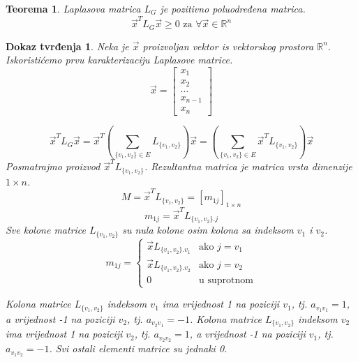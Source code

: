 \documentclass[11pt]{article}
\newtheorem{theorem}{Teorema}
\newtheorem*{custom_proof}{Dokaz tvrđenja}
\begin{document}
	\begin{theorem} Laplasova matrica $L_G$ je pozitivno poluodređena matrica. 
	\[
	  \vec{x}^TL_G\vec{x} \geq 0 \text{ za } \forall \vec{x} \in \mathbb{R}^n
	\] 
	\end{theorem}
	\begin{custom_proof}
	Neka je $\vec{x}$ proizvoljan vektor is vektorskog prostora $\mathbb{R}^n$. Iskoristićemo prvu karakterizaciju Laplasove matrice.
	\[
	\vec{x} = 
	\begin{bmatrix} 
	x_1 \\ x_2 \\ \dots \\ x_{n-1} \\ x_n
	\end{bmatrix}
	\]

	\[
	  \vec{x}^TL_G\vec{x} = \vec{x}^T (\sum_{\{v_1,v_2\} \in E} L_{\{v_1,v_2\}}) \vec{x}  =  (\sum_{\{v_1,v_2\} \in E} \vec{x}^TL_{\{v_1,v_2\}}) \vec{x}
	\]
	Posmatrajmo proizvod $\vec{x}^T L_{\{v_1,v_2\}}$. Rezultantna matrica je matrica vrsta dimenzije $1 \times n$.
	\[
	M = \vec{x}^T L_{\{v_1,v_2\}} = [m_{1j}]_{1 \times n}
	\]
	\[
	m_{1j} = \vec{x}^T L_{\{v_1,v_2\} . j}
	\]
	Sve kolone matrice $L_{\{v_1,v_2\}}$ su nula kolone osim kolona sa indeksom $v_1$ i $v_2$.
	\[
	 m_{1j} =
	 \begin{cases}
	 \vec{x} L_{\{v_1,v_2\} . v_1}  & \text{ako } j = v_1 \\ 
	 \vec{x} L_{\{v_1,v_2\} . v_2}  & \text{ako } j = v_2  \\ 
	 0  & \text{u suprotnom}
	 \end{cases}
	\]

	Kolona matrice $L_{\{v_1,v_2\}}$ indeksom $v_1$ ima vrijednost 1 na poziciji $v_1$, tj. $a_{v_1 v_1} = 1$, a vrijednost -1 na poziciji $v_2$, tj. $a_{v_2 v_1} = -1$.
	Kolona matrice $L_{\{v_1,v_2\}}$ indeksom $v_2$ ima vrijednost 1 na poziciji $v_2$, tj. $a_{v_2 v_2} = 1$, a vrijednost -1 na poziciji $v_1$, tj. $a_{v_1 v_2} = -1$.
	Svi ostali elementi matrice su jednaki 0.


\end{custom_proof}
\end{document}
